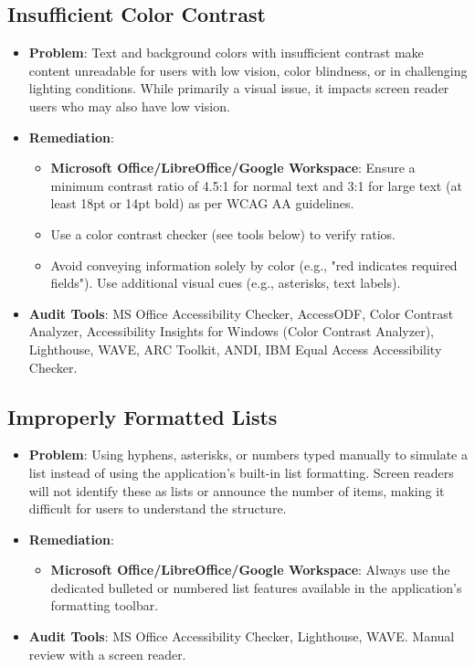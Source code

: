 \subsection{Insufficient Color Contrast}
\begin{itemize}
    \item \textbf{Problem}: Text and background colors with insufficient contrast make content unreadable for users with low vision, color blindness, or in challenging lighting conditions. While primarily a visual issue, it impacts screen reader users who may also have low vision.
    \item \textbf{Remediation}:
        \begin{itemize}
            \item \textbf{Microsoft Office/LibreOffice/Google Workspace}: Ensure a minimum contrast ratio of 4.5:1 for normal text and 3:1 for large text (at least 18pt or 14pt bold) as per WCAG AA guidelines.
            \item Use a color contrast checker (see tools below) to verify ratios.
            \item Avoid conveying information solely by color (e.g., "red indicates required fields"). Use additional visual cues (e.g., asterisks, text labels).
        \end{itemize}
    \item \textbf{Audit Tools}: MS Office Accessibility Checker, AccessODF, Color Contrast Analyzer, Accessibility Insights for Windows (Color Contrast Analyzer), Lighthouse, WAVE, ARC Toolkit, ANDI, IBM Equal Access Accessibility Checker.
\end{itemize}

\subsection{Improperly Formatted Lists}
\begin{itemize}
    \item \textbf{Problem}: Using hyphens, asterisks, or numbers typed manually to simulate a list instead of using the application's built-in list formatting. Screen readers will not identify these as lists or announce the number of items, making it difficult for users to understand the structure.
    \item \textbf{Remediation}:
        \begin{itemize}
            \item \textbf{Microsoft Office/LibreOffice/Google Workspace}: Always use the dedicated bulleted or numbered list features available in the application's formatting toolbar.
        \end{itemize}
    \item \textbf{Audit Tools}: MS Office Accessibility Checker, Lighthouse, WAVE. Manual review with a screen reader.
\end{itemize}

